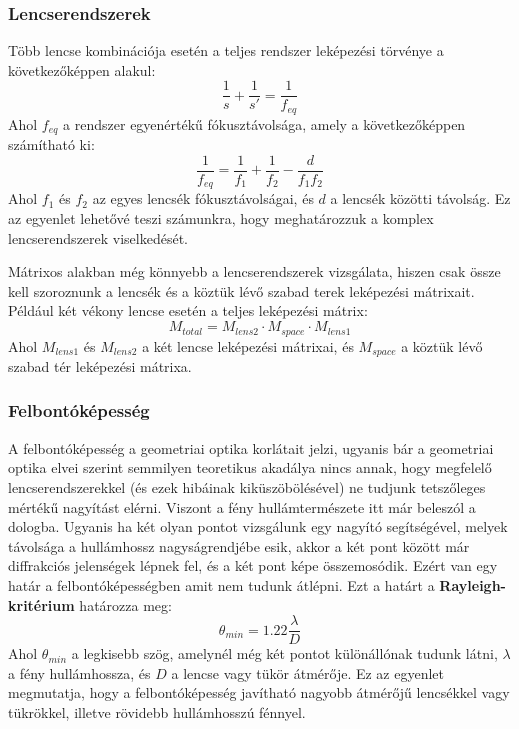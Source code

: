 \documentclass[../main.tex]{subfiles}
\begin{document}
\subsubsection*{Lencserendszerek}
Több lencse kombinációja esetén a teljes rendszer leképezési törvénye a következőképpen alakul:
\begin{equation}
    \frac{1}{s} + \frac{1}{s'} = \frac{1}{f_{eq}}
\end{equation}
Ahol $f_{eq}$ a rendszer egyenértékű fókusztávolsága, amely a következőképpen számítható ki:
\begin{equation}
    \frac{1}{f_{eq}} = \frac{1}{f_1} + \frac{1}{f_2} - \frac{d}{f_1 f_2}
\end{equation}
Ahol $f_1$ és $f_2$ az egyes lencsék fókusztávolságai, és $d$ a lencsék közötti távolság. Ez az egyenlet lehetővé teszi számunkra, hogy meghatározzuk a komplex lencserendszerek viselkedését.

Mátrixos alakban még könnyebb a lencserendszerek vizsgálata, hiszen csak össze kell szoroznunk a lencsék és a köztük lévő szabad terek leképezési mátrixait.
Például két vékony lencse esetén a teljes leképezési mátrix:
\begin{equation}
    M_{total} = M_{lens2} \cdot M_{space} \cdot M_{lens1}
\end{equation}
Ahol $M_{lens1}$ és $M_{lens2}$ a két lencse leképezési mátrixai, és $M_{space}$ a köztük lévő szabad tér leképezési mátrixa.

\subsubsection{Felbontóképesség}
A felbontóképesség a geometriai optika korlátait jelzi, ugyanis bár a geometriai optika elvei szerint semmilyen teoretikus akadálya nincs annak, hogy megfelelő lencserendszerekkel (és ezek hibáinak kiküszöbölésével)
ne tudjunk tetszőleges mértékű nagyítást elérni. Viszont a fény hullámtermészete itt már beleszól a dologba. Ugyanis ha két olyan pontot vizsgálunk egy nagyító segítségével,
melyek távolsága a hullámhossz nagyságrendjébe esik, akkor a két pont között már diffrakciós jelenségek lépnek fel, és a két pont képe összemosódik. Ezért van egy határ a felbontóképességben amit nem tudunk átlépni. Ezt a határt a \textbf{Rayleigh-kritérium} határozza meg:
\begin{equation}
    \theta_{min} = 1.22 \frac{\lambda}{D}
\end{equation}
Ahol $\theta_{min}$ a legkisebb szög, amelynél még két pontot különállónak tudunk látni, $\lambda$ a fény hullámhossza, és $D$ a lencse vagy tükör átmérője. Ez az egyenlet megmutatja, hogy a felbontóképesség
javítható nagyobb átmérőjű lencsékkel vagy tükrökkel, illetve rövidebb hullámhosszú fénnyel.
\end{document}
